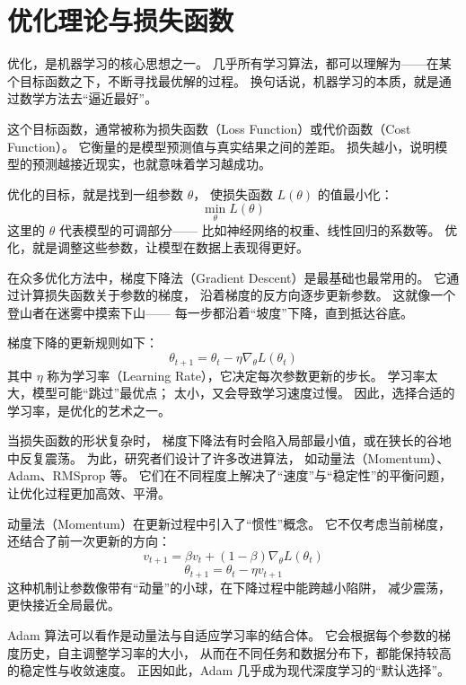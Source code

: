 \section{优化理论与损失函数}

优化，是机器学习的核心思想之一。  
几乎所有学习算法，都可以理解为——在某个目标函数之下，不断寻找最优解的过程。  
换句话说，机器学习的本质，就是通过数学方法去“逼近最好”。



这个目标函数，通常被称为损失函数（Loss Function）或代价函数（Cost Function）。  
它衡量的是模型预测值与真实结果之间的差距。  
损失越小，说明模型的预测越接近现实，也就意味着学习越成功。



优化的目标，就是找到一组参数 $\theta$，  
使损失函数 $L(\theta)$ 的值最小化：
$$
\min_{\theta} L(\theta)
$$  
这里的 $\theta$ 代表模型的可调部分——  
比如神经网络的权重、线性回归的系数等。  
优化，就是调整这些参数，让模型在数据上表现得更好。



在众多优化方法中，梯度下降法（Gradient Descent）是最基础也最常用的。  
它通过计算损失函数关于参数的梯度，  
沿着梯度的反方向逐步更新参数。  
这就像一个登山者在迷雾中摸索下山——  
每一步都沿着“坡度”下降，直到抵达谷底。



梯度下降的更新规则如下：
$$
\theta_{t+1} = \theta_t - \eta \nabla_\theta L(\theta_t)
$$  
其中 $\eta$ 称为学习率（Learning Rate），它决定每次参数更新的步长。  
学习率太大，模型可能“跳过”最优点；  
太小，又会导致学习速度过慢。  
因此，选择合适的学习率，是优化的艺术之一。



当损失函数的形状复杂时，  
梯度下降法有时会陷入局部最小值，或在狭长的谷地中反复震荡。  
为此，研究者们设计了许多改进算法，  
如动量法（Momentum）、Adam、RMSprop 等。  
它们在不同程度上解决了“速度”与“稳定性”的平衡问题，  
让优化过程更加高效、平滑。



动量法（Momentum）在更新过程中引入了“惯性”概念。  
它不仅考虑当前梯度，还结合了前一次更新的方向：  
$$
v_{t+1} = \beta v_t + (1 - \beta) \nabla_\theta L(\theta_t)
$$  
$$
\theta_{t+1} = \theta_t - \eta v_{t+1}
$$  
这种机制让参数像带有“动量”的小球，在下降过程中能跨越小陷阱，  
减少震荡，更快接近全局最优。



Adam 算法可以看作是动量法与自适应学习率的结合体。  
它会根据每个参数的梯度历史，自主调整学习率的大小，  
从而在不同任务和数据分布下，都能保持较高的稳定性与收敛速度。  
正因如此，Adam 几乎成为现代深度学习的“默认选择”。



